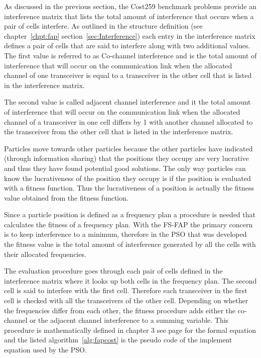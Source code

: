 As discussed in the previous section, the Cost259 benchmark problems provide an interference matrix that lists the total amount of interference that occurs when a pair of cells interfere. As outlined in the structure definition (see chapter~\ref{chpt:fap} section~\ref{sec:Interference}) each entry in the interference matrix defines a pair of cells that are said to interfere along with two additional values. The first value is referred to as Co-channel interference and is the total amount of interference that will occur on the communication link when the allocated channel of one transceiver is equal to a transceiver in the other cell that is listed in the interference matrix. 

The second value is called adjacent channel interference and it the total amount of interference that will occur on the communication link when the allocated channel of a transceiver in one cell differs by 1 with another channel allocated to the transceiver from the other cell that is listed in the interference matrix.

Particles move towards other particles because the other particles have indicated (through information sharing) that the positions they occupy are very lucrative and thus they have found potential good solutions. The only way particles can know the lucrativeness of the position they occupy is if the position is evaluated with a fitness function. Thus the lucrativeness of a position is actually the fitness value obtained from the fitness function. 

Since a particle position is defined as a frequency plan a procedure is needed that calculates the fitness of a frequency plan. With the FS-FAP the primary concern is to keep interference to a minimum, therefore in the PSO that was developed the fitness value is the total amount of interference generated by all the cells with their allocated frequencies. 

The evaluation procedure goes through each pair of cells defined in the interference matrix where it looks up both cells in the frequency plan. The second cell is said to interfere with the first cell. Therefore each transceiver in the first cell is checked with all the transceivers of the other cell. Depending on whether the frequencies differ from each other, the fitness procedure adds either the co-channel or the adjacent channel interference to a summing variable. This procedure is mathematically defined in chapter 3 see page \pageref{E:costFunction} for the formal equation and the listed algorithm~\ref{alg:fapcost} is the pseudo code of the implement equation used by the PSO. 

